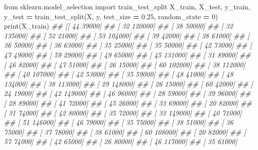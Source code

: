 \documentclass[
]{book}
\newenvironment{Shaded}{\begin{snugshade}}{\end{snugshade}}
\newcommand{\BuiltInTok}[1]{#1}
\newcommand{\CommentTok}[1]{\textcolor[rgb]{0.56,0.35,0.01}{\textit{#1}}}
\newcommand{\DecValTok}[1]{\textcolor[rgb]{0.00,0.00,0.81}{#1}}
\newcommand{\FloatTok}[1]{\textcolor[rgb]{0.00,0.00,0.81}{#1}}
\newcommand{\ImportTok}[1]{#1}
\newcommand{\NormalTok}[1]{#1}
\newcommand{\OperatorTok}[1]{\textcolor[rgb]{0.81,0.36,0.00}{\textbf{#1}}}
\theoremstyle{definition}
\theoremstyle{definition}
\theoremstyle{definition}
\theoremstyle{definition}
\theoremstyle{remark}
\begin{document}
\begin{Shaded}
\begin{Highlighting}[]
\ImportTok{from}\NormalTok{ sklearn.model\_selection }\ImportTok{import}\NormalTok{ train\_test\_split}
\NormalTok{X\_train, X\_test, y\_train, y\_test }\OperatorTok{=}\NormalTok{ train\_test\_split(X, y, test\_size }\OperatorTok{=} \FloatTok{0.25}\NormalTok{, random\_state }\OperatorTok{=} \DecValTok{0}\NormalTok{)}
\BuiltInTok{print}\NormalTok{(X\_train)}
\CommentTok{\#\# [[    44  39000]}
\CommentTok{\#\#  [    32 120000]}
\CommentTok{\#\#  [    38  50000]}
\CommentTok{\#\#  [    32 135000]}
\CommentTok{\#\#  [    52  21000]}
\CommentTok{\#\#  [    53 104000]}
\CommentTok{\#\#  [    39  42000]}
\CommentTok{\#\#  [    38  61000]}
\CommentTok{\#\#  [    36  50000]}
\CommentTok{\#\#  [    36  63000]}
\CommentTok{\#\#  [    35  25000]}
\CommentTok{\#\#  [    35  50000]}
\CommentTok{\#\#  [    42  73000]}
\CommentTok{\#\#  [    47  49000]}
\CommentTok{\#\#  [    59  29000]}
\CommentTok{\#\#  [    49  65000]}
\CommentTok{\#\#  [    45 131000]}
\CommentTok{\#\#  [    31  89000]}
\CommentTok{\#\#  [    46  82000]}
\CommentTok{\#\#  [    47  51000]}
\CommentTok{\#\#  [    26  15000]}
\CommentTok{\#\#  [    60 102000]}
\CommentTok{\#\#  [    38 112000]}
\CommentTok{\#\#  [    40 107000]}
\CommentTok{\#\#  [    42  53000]}
\CommentTok{\#\#  [    35  59000]}
\CommentTok{\#\#  [    48  41000]}
\CommentTok{\#\#  [    48 134000]}
\CommentTok{\#\#  [    38 113000]}
\CommentTok{\#\#  [    29 148000]}
\CommentTok{\#\#  [    26  15000]}
\CommentTok{\#\#  [    60  42000]}
\CommentTok{\#\#  [    24  19000]}
\CommentTok{\#\#  [    42 149000]}
\CommentTok{\#\#  [    46  96000]}
\CommentTok{\#\#  [    28  59000]}
\CommentTok{\#\#  [    39  96000]}
\CommentTok{\#\#  [    28  89000]}
\CommentTok{\#\#  [    41  72000]}
\CommentTok{\#\#  [    45  26000]}
\CommentTok{\#\#  [    33  69000]}
\CommentTok{\#\#  [    20  82000]}
\CommentTok{\#\#  [    31  74000]}
\CommentTok{\#\#  [    42  80000]}
\CommentTok{\#\#  [    35  72000]}
\CommentTok{\#\#  [    33 149000]}
\CommentTok{\#\#  [    40  71000]}
\CommentTok{\#\#  [    51 146000]}
\CommentTok{\#\#  [    46  79000]}
\CommentTok{\#\#  [    35  75000]}
\CommentTok{\#\#  [    38  51000]}
\CommentTok{\#\#  [    36  75000]}
\CommentTok{\#\#  [    37  78000]}
\CommentTok{\#\#  [    38  61000]}
\CommentTok{\#\#  [    60 108000]}
\CommentTok{\#\#  [    20  82000]}
\CommentTok{\#\#  [    57  74000]}
\CommentTok{\#\#  [    42  65000]}
\CommentTok{\#\#  [    26  80000]}
\CommentTok{\#\#  [    46 117000]}
\CommentTok{\#\#  [    35  61000]}

\end{Highlighting}
\end{Shaded}
\end{document}
